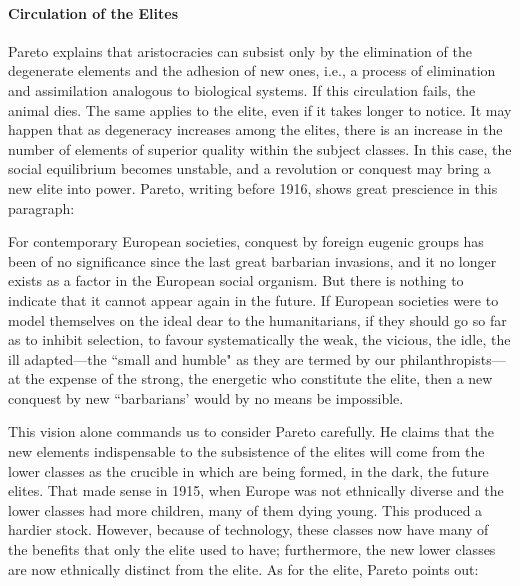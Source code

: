 \paragraph{Circulation of the Elites}
Pareto explains that aristocracies can subsist only by the elimination of the degenerate elements and the adhesion of new ones, i.e., a process of elimination and assimilation analogous to biological systems. If this circulation fails, the animal dies. The same applies to the elite, even if it takes longer to notice. It may happen that as degeneracy increases among the elites, there is an increase in the number of elements of superior quality within the subject classes. In this case, the social equilibrium becomes unstable, and a revolution or conquest may bring a new elite into power. Pareto, writing before 1916, shows great prescience in this paragraph:

\begin{quotex}
For contemporary European societies, conquest by foreign eugenic groups has been of no significance since the last great barbarian invasions, and it no longer exists as a factor in the European social organism. But there is nothing to indicate that it cannot appear again in the future. If European societies were to model themselves on the ideal dear to the humanitarians, if they should go so far as to inhibit selection, to favour systematically the weak, the vicious, the idle, the ill adapted—the ``small and humble" as they are termed by our philanthropists—at the expense of the strong, the energetic who constitute the elite, then a new conquest by new ``barbarians' would by no means be impossible. 

\end{quotex}
This vision alone commands us to consider Pareto carefully. He claims that the new elements indispensable to the subsistence of the elites will come from the lower classes as the crucible in which are being formed, in the dark, the future elites. That made sense in 1915, when Europe was not ethnically diverse and the lower classes had more children, many of them dying young. This produced a hardier stock. However, because of technology, these classes now have many of the benefits that only the elite used to have; furthermore, the new lower classes are now ethnically distinct from the elite. As for the elite, Pareto points out:

